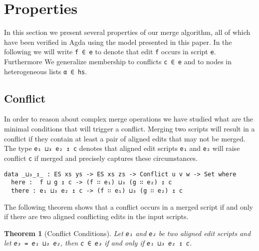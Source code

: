 \documentclass[preprint]{sigplanconf}
\theoremstyle{plain}
\newtheorem{thm}{Theorem}
\begin{document}
\section{Properties}
\label{sec:properties}
In this section we present several properties of our merge algorithm,
all of which have been verified in Agda using the model presented in
this paper.  
%
In the following we will write \texttt{f ∈ e} to denote that edit
\texttt{f} occurs in script \texttt{e}.
%
Furthermore We generalize membership to conflicts \texttt{c ∈ e} and
to nodes in heterogeneous lists \texttt{α ∈ hs}.
  
    \subsection{Conflict}  
    In order to reason about complex merge operations we have studied
    what are the minimal conditions that will trigger a conflict.
    Merging two scripts will result in a conflict if they contain at
    least a pair of aligned edits that may not be merged.  
    The type \texttt{e₁ ⊔₃ e₂ ↥ c} denotes that aligned edit scripts
    \texttt{e₁} and \texttt{e₂} will raise conflict \texttt{c} if
    merged and precisely captures these circumstances.

\begin{verbatim}
data _⊔₃_↥_ : ES xs ys -> ES xs zs -> Conflict u v w -> Set where
  here :  f ⊔ g ↥ c -> (f ∷ e₁) ⊔₃ (g ∷ e₂) ↥ c
  there : e₁ ⊔₃ e₂ ↥ c -> (f ∷ e₁) ⊔₃ (g ∷ e₂) ↥ c
\end{verbatim}



    The following theorem shows that a conflict occurs in a merged script
    if and only if there are two aligned conflicting edits in the input scripts.
    
\begin{thm}[Conflict Conditions]
  Let \texttt{e₁} and \texttt{e₂} be two aligned edit scripts
  and let \texttt{e₃ = e₁ ⊔₃ e₂}, then \texttt{c ∈ e₃} if and only if
  \texttt{e₁ ⊔₃ e₂ ↥ c}.
\end{thm}
\end{document}
